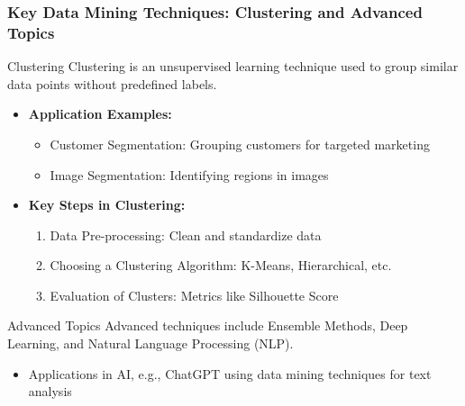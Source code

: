 \documentclass[aspectratio=169]{beamer}
\begin{document}
\begin{frame}[fragile]
    \frametitle{Key Data Mining Techniques: Clustering and Advanced Topics}
    \begin{block}{Clustering}
        Clustering is an unsupervised learning technique used to group similar data points without predefined labels.
    \end{block}

    \begin{itemize}
        \item \textbf{Application Examples:}
            \begin{itemize}
                \item Customer Segmentation: Grouping customers for targeted marketing
                \item Image Segmentation: Identifying regions in images
            \end{itemize}
        
        \item \textbf{Key Steps in Clustering:}
            \begin{enumerate}
                \item Data Pre-processing: Clean and standardize data
                \item Choosing a Clustering Algorithm: K-Means, Hierarchical, etc.
                \item Evaluation of Clusters: Metrics like Silhouette Score
            \end{enumerate}
    \end{itemize}

    \begin{block}{Advanced Topics}
        Advanced techniques include Ensemble Methods, Deep Learning, and Natural Language Processing (NLP).
    \end{block}

    \begin{itemize}
        \item Applications in AI, e.g., ChatGPT using data mining techniques for text analysis
    \end{itemize}
\end{frame}
\end{document}
